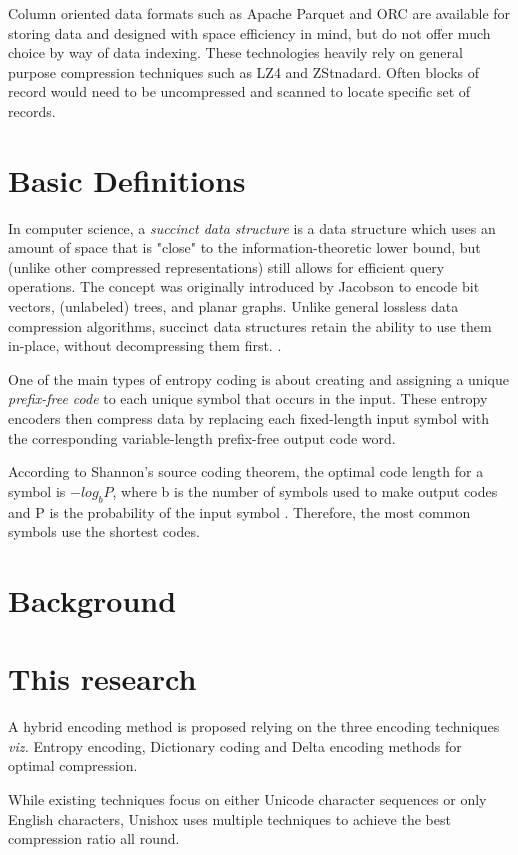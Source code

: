 \documentclass[]{article}
\begin{document}
	Column oriented data formats such as Apache Parquet and ORC are available for storing data and designed with space efficiency in mind, but do not offer much choice by way of data indexing.  These technologies heavily rely on general purpose compression techniques such as LZ4 and ZStnadard.  Often blocks of record would need to be uncompressed and scanned to locate specific set of records.

	\section{Basic Definitions}

	In computer science, a \emph{succinct data structure} is a data structure which uses an amount of space that is "close" to the information-theoretic lower bound, but (unlike other compressed representations) still allows for efficient query operations. The concept was originally introduced by Jacobson \cite{1} to encode bit vectors, (unlabeled) trees, and planar graphs. Unlike general lossless data compression algorithms, succinct data structures retain the ability to use them in-place, without decompressing them first.  \cite{2}.

	One of the main types of entropy coding is about creating and assigning a unique \emph{prefix-free code} to each unique symbol that occurs in the input. These entropy encoders then compress data by replacing each fixed-length input symbol with the corresponding variable-length prefix-free output code word.
	
	According to Shannon's source coding theorem, the optimal code length for a symbol is $-log_bP$, where b is the number of symbols used to make output codes and P is the probability of the input symbol \cite{2}. Therefore, the most common symbols use the shortest codes.
	
	\section{Background}

	\section{This research}

	A hybrid encoding method is proposed relying on the three encoding techniques \emph{viz.} Entropy encoding, Dictionary coding and Delta encoding methods for optimal compression.
	
	While existing techniques focus on either Unicode character sequences or only English characters, Unishox uses multiple techniques to achieve the best compression ratio all round.
	
\end{document}
